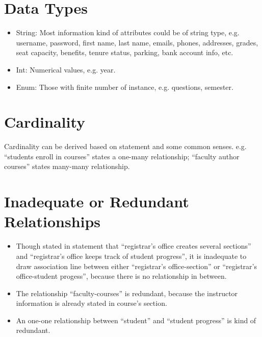 \documentclass[12pt]{article}
\begin{document}
\section{Data Types}
\begin{itemize}
    \item String: Most information kind of attributes could be of string type, e.g. username, password, first name, last name, emails, phones, addresses, grades, seat capacity, benefits, tenure status, parking, bank account info, etc.
    \item Int: Numerical values, e.g. year.
    \item Enum: Those with finite number of instance, e.g. questions, semester. 
\end{itemize}

\section{Cardinality}
Cardinality can be derived based on statement and some common senses. e.g. ``students enroll in courses'' states a one-many relationship; ``faculty author courses'' states many-many relationship.
\section{Inadequate or Redundant Relationships}
\begin{itemize}
    \item Though stated in statement that ``registrar's office creates several sections'' and ``registrar's office keeps track of student progress'', it is inadequate to draw association line between either ``registrar's office-section'' or ``registrar's office-student progess'', because there is no relationship in between.
    \item The relationship ``faculty-courses'' is redundant, because the instructor information is already stated in course's section.
    \item An one-one relationship between ``student'' and ``student progress'' is kind of redundant.
\end{itemize}
\end{document}
